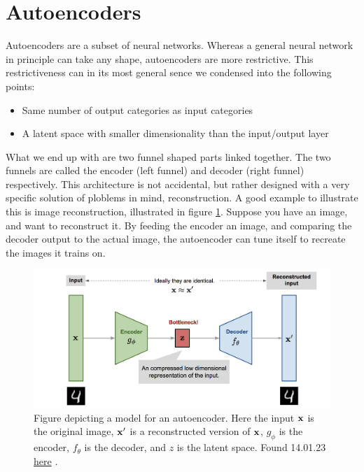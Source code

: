 \section{Autoencoders}
Autoencoders are a subset of neural networks. Whereas a general neural network
 in principle can take any shape, autoencoders are more restrictive.
This restrictiveness can in its most general sence we condensed 
into the following points:
\begin{itemize}
    \item Same number of output categories as input categories  
    \item A latent space with smaller dimensionality than the input/output layer  
\end{itemize}
What we end up with are two funnel shaped parts linked together. The two funnels are 
called the encoder (left funnel) and decoder (right funnel) respectively. This architecture is not 
accidental, but rather designed with a very specific solution of ploblems in mind, reconstruction. 
A good example to illustrate this is image reconstruction, illustrated in figure \ref{fig:ae_denoise}. 
Suppose you have an image, and want to reconstruct it. By feeding the encoder an image, 
and comparing the decoder output to the actual image, the autoencoder can tune itself to recreate the images it trains on. 

\begin{figure}[H]
    \includegraphics[width=\linewidth]{Figures/Machinelearning/autoencoder_imagedenoising.png}
    \caption[Conceptual autoencoder]{Figure depicting a model for an autoencoder. Here the input $\bf{x}$ is the original image, $\bf{x'}$ is a reconstructed version of $\bf{x}$, $g_{\phi}$ is the encoder, $f_{\theta}$ is the decoder, and $z$ is the latent space. Found 14.01.23 \href{https://lilianweng.github.io/posts/2018-08-12-vae/autoencoder-architecture.png}{here} \cite{weng2018VAE}. }
    \label{fig:ae_denoise}
\end{figure}

